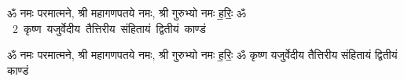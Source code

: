 \documentclass[17pt]{extarticle}
\begin{document}
\begin{titlepage}
    \begin{center}
 
\begin{sanskrit}
    { \Large
    ॐ नमः परमात्मने, श्री महागणपतये नमः, श्री गुरुभ्यो नमः
ह॒रिः॒ ॐ 
    }
    \\
    \vspace{2.5cm}
    \mbox{ \Huge
    2       कृष्ण यजुर्वेदीय तैत्तिरीय संहितायं द्वितीयं काण्डं   }
\end{sanskrit}
\end{center}

\end{titlepage}
\tableofcontents

ॐ नमः परमात्मने, श्री महागणपतये नमः, श्री गुरुभ्यो नमः
ह॒रिः॒ ॐ        कृष्ण यजुर्वेदीय तैत्तिरीय संहितायं द्वितीयं काण्डं \newline
\end{document}
